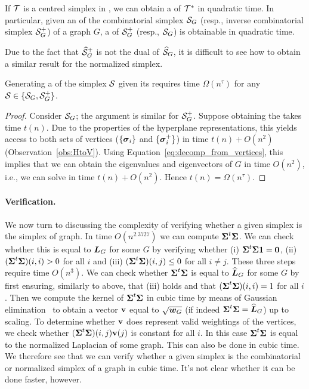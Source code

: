 \begin{corollary}
	\label{cor:hdesc_S_to_S+}
	If $\mathcal{T}$ is a centred simplex in \hdesc, we can obtain a \vdesc of $\mathcal{T}^*$ in quadratic time. In particular, given  an \hdesc of the combinatorial simplex $\mathcal{S}_G$ (resp., inverse combinatorial  simplex $\mathcal{S}_G^+$)  of a graph $G$, a \vdesc of $\mathcal{S}_G^+$ (resp., $\mathcal{S}_G$)  is obtainable in quadratic time. 
\end{corollary}

Due to the fact that $\widehat{\mathcal{S}}_G^+$ is not the dual of $\widehat{\mathcal{S}}_G$,  it is difficult to  see how to  obtain a similar result  for the normalized simplex. 

\begin{lemma}
	\label{lem:hdesc_to_vdesc}
	Generating a \vdesc of the simplex $\mathcal{S}$ given its \hdesc requires time $\Omega(n^\tau)$ for any $\mathcal{S}\in\{\mathcal{S}_G,\mathcal{S}_G^+\}$. 
\end{lemma}
\begin{proof}
	Consider $\mathcal{S}_G$; the argument is similar for $\mathcal{S}_G^+$. Suppose obtaining the \vdesc takes time $t(n)$. Due to the properties of the hyperplane representations, this yields access to both sets of vertices ($\{\vb*{\sigma}_i\}$ and $\{\vb*{\sigma}_i^+\}$) in time $t(n)+O(n^2)$ (Observation~\ref{obs:HtoV}). Using Equation~\eqref{eq:decomp_from_vertices}, this implies that we can obtain the eigenvalues and eigenvectors of $G$ in time $O(n^2)$, i.e., we can solve \lapdecomp in time $t(n)+O(n^2)$. Hence $t(n)=\Omega(n^\tau)$. 
\end{proof}


\paragraph{Verification.}
We  now turn  to discussing the complexity of  verifying whether  a given simplex is the simplex of graph. 
In time $O(n^{2.3727})$ we can compute $\boldsymbol{\Sigma}^t\boldsymbol{\Sigma}$. We can check whether this is equal to $\vb*{L}_G$ for some $G$ by verifying whether (i) $\boldsymbol{\Sigma}^t\boldsymbol{\Sigma}\vb{1}=\vb{0}$, (ii) $(\boldsymbol{\Sigma}^t\boldsymbol{\Sigma})(i,i)>0$ for all $i$ and (iii) $(\boldsymbol{\Sigma}^t\boldsymbol{\Sigma})(i,j)\leq 0$ for all $i\neq j$. These three steps require time $O(n^3)$. We can check whether $\boldsymbol{\Sigma}^t\boldsymbol{\Sigma}$ is equal to $\widehat{\vb*{L}}_G$ for some $G$ by first ensuring, similarly to above, that (iii) holds and that $(\boldsymbol{\Sigma}^t\boldsymbol{\Sigma})(i,i)=1$ for all $i$. Then we compute the kernel  of $\boldsymbol{\Sigma}^t\boldsymbol{\Sigma}$ in cubic time by means of Gaussian elimination~\cite{kailath1999fast} to obtain a vector $\vb{v}$ equal to $\sqrt{\vb*{w}_G}$ (if indeed $\boldsymbol{\Sigma}^t\boldsymbol{\Sigma}=\widehat{\vb*{L}}_G$) up to scaling. To determine whether $\vb{v}$ does represent valid weightings of the vertices, we check whether $(\boldsymbol{\Sigma}^t\boldsymbol{\Sigma})(i,j)\vb{v}(j)$ is constant for all $i$. In  this case $\boldsymbol{\Sigma}^t\boldsymbol{\Sigma}$ is equal to the normalized Laplacian of some graph. This can also be done in cubic time. We  therefore see that we can  verify whether a given simplex is the combinatorial or  normalized simplex of a graph in  cubic time. It's not clear whether it can be done faster, however. 

